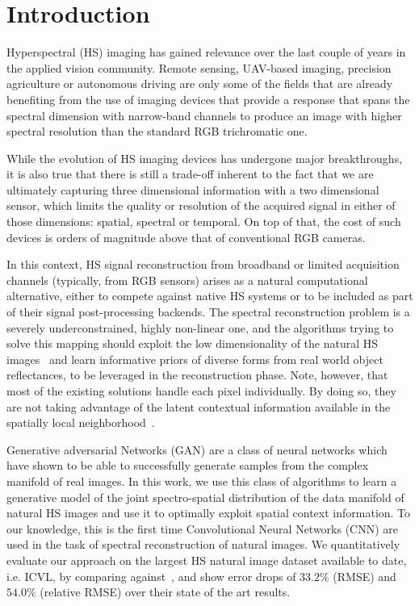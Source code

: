 \documentclass[10pt,twocolumn,letterpaper]{article}
\begin{document}

\section{Introduction}
\label{sec:intro}

Hyperspectral (HS) imaging has gained relevance over the last couple of years in the applied vision community. 
Remote sensing, UAV-based imaging, precision agriculture or autonomous driving are only some of the fields that are already benefiting from the use of imaging devices that provide a response that spans the spectral dimension with narrow-band channels to produce an image with higher spectral resolution than the standard RGB trichromatic one.

While the evolution of HS imaging devices has undergone major breakthroughs, it is also true that there is still a trade-off inherent to the fact that we are ultimately capturing three dimensional information with a two dimensional sensor, which limits the quality or resolution of the acquired signal in either of those dimensions: spatial, spectral or temporal. 
On top of that, the cost of such devices is orders of magnitude above that of conventional RGB cameras.

In this context, HS signal reconstruction from broadband or limited acquisition channels (typically, from RGB sensors) arises as a natural computational alternative, either to compete against native HS systems or to be included as part of their signal post-processing backends. 
The spectral reconstruction problem is a severely underconstrained, highly non-linear one, and the algorithms trying to solve this mapping should exploit the low dimensionality of the natural HS images~\cite{chakrabarti2011statistics} and learn informative priors of diverse forms from real world object reflectances, to be leveraged in the reconstruction phase.
Note, however, that most of the existing solutions handle each pixel individually.
By doing so, they are not taking advantage of the latent contextual information available in the spatially local neighborhood~\cite{chakrabarti2011statistics}.

Generative adversarial Networks (GAN) are a class of neural networks which have shown to be able to successfully generate samples from the complex manifold of real images.
In this work, we use this class of algorithms to learn a generative model of the joint spectro-spatial distribution of the data manifold of natural HS images and use it to optimally exploit spatial context information.
To our knowledge, this is the first time Convolutional Neural Networks (CNN) are used in the task of spectral reconstruction of natural images.
We quantitatively evaluate our approach on the largest HS natural image dataset available to date, i.e. ICVL, by comparing against~\cite{arad_sparse_2016}, and show error drops of $33.2\%$ (RMSE) and $54.0\%$ (relative RMSE) over their state of the art results.
\end{document}
